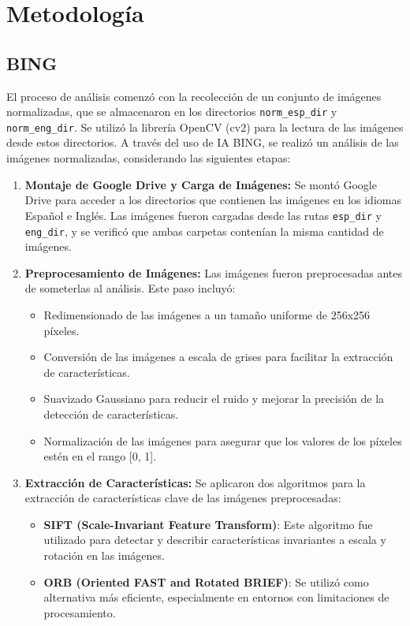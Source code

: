 \documentclass[unnumsec,webpdf,modern,large]{mam-authoring-template}
\theoremstyle{thmstyleone}%
\theoremstyle{thmstyletwo}%
\theoremstyle{thmstylethree}%
\begin{document}
\section{Metodología}
\subsection{BING}
El proceso de análisis comenzó con la recolección de un conjunto de imágenes normalizadas, que se almacenaron en los directorios \texttt{norm\_esp\_dir} y \texttt{norm\_eng\_dir}. Se utilizó la librería OpenCV (cv2) para la lectura de las imágenes desde estos directorios. A través del uso de IA BING, se realizó un análisis de las imágenes normalizadas, considerando las siguientes etapas:

\begin{enumerate}
    \item \textbf{Montaje de Google Drive y Carga de Imágenes:} Se montó Google Drive para acceder a los directorios que contienen las imágenes en los idiomas Español e Inglés. Las imágenes fueron cargadas desde las rutas \texttt{esp\_dir} y \texttt{eng\_dir}, y se verificó que ambas carpetas contenían la misma cantidad de imágenes.
    
    \item  \textbf{Preprocesamiento de Imágenes:} Las imágenes fueron preprocesadas antes de someterlas al análisis. Este paso incluyó:
    \begin{itemize}
        \item Redimensionado de las imágenes a un tamaño uniforme de 256x256 píxeles.
        \item Conversión de las imágenes a escala de grises para facilitar la extracción de características.
        \item Suavizado Gaussiano para reducir el ruido y mejorar la precisión de la detección de características.
        \item Normalización de las imágenes para asegurar que los valores de los píxeles estén en el rango [0, 1].
    \end{itemize}
    
    \item \textbf{Extracción de Características:} Se aplicaron dos algoritmos para la extracción de características clave de las imágenes preprocesadas:
    \begin{itemize}
        \item \textbf{SIFT (Scale-Invariant Feature Transform)}: Este algoritmo fue utilizado para detectar y describir características invariantes a escala y rotación en las imágenes.
        \item \textbf{ORB (Oriented FAST and Rotated BRIEF)}: Se utilizó como alternativa más eficiente, especialmente en entornos con limitaciones de procesamiento.
    \end{itemize}
    

\end{enumerate}
\end{document}
